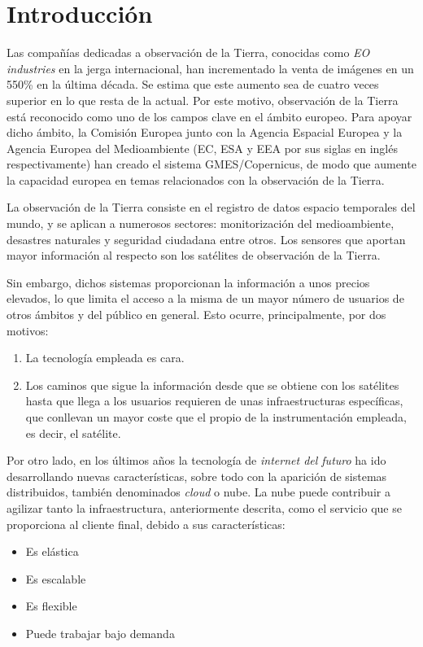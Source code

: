 \section{Introducción}
\label{sec:intro}

Las compañías dedicadas a observación de la Tierra, conocidas como \emph{EO industries} en la jerga internacional, han incrementado la venta de imágenes en un 550\% en la última década. Se estima que este aumento sea de cuatro veces superior en lo que resta de la actual. Por este motivo, observación de la Tierra está reconocido como uno de los campos clave en el ámbito europeo. Para apoyar dicho ámbito, la Comisión Europea junto con la Agencia Espacial Europea y la Agencia Europea del Medioambiente (EC, ESA y EEA por sus siglas en inglés respectivamente) han creado el sistema GMES/Copernicus, de modo que aumente la capacidad europea en temas relacionados con la observación de la Tierra.

La observación de la Tierra consiste en el registro de datos espacio temporales del mundo, y se aplican a numerosos sectores: monitorización del medioambiente, desastres naturales y seguridad ciudadana entre otros. Los sensores que aportan mayor información al respecto son los satélites de observación de la Tierra.

Sin embargo, dichos sistemas proporcionan la información a unos precios elevados, lo que limita el acceso a la misma de un mayor número de usuarios de otros ámbitos y del público en general. Esto ocurre, principalmente, por dos motivos:
\begin{enumerate}
\item La tecnología empleada es cara.
\item Los caminos que sigue la información desde que se obtiene con los satélites hasta que llega a los usuarios requieren de unas infraestructuras específicas, que conllevan un mayor coste que el propio de la instrumentación empleada, es decir, el satélite.
\end{enumerate}

Por otro lado, en los últimos años la tecnología de \emph{internet del futuro} ha ido desarrollando nuevas características, sobre todo con la aparición de sistemas distribuidos, también denominados \emph{cloud} o nube. La nube puede contribuir a agilizar tanto la infraestructura, anteriormente descrita, como el servicio que se proporciona al cliente final, debido a sus características:
\begin{itemize}
\item Es elástica
\item Es escalable
\item Es flexible
\item Puede trabajar bajo demanda
\end{itemize}

